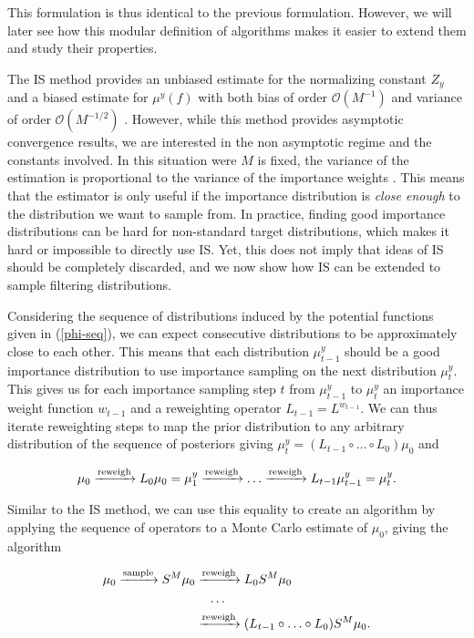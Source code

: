 This formulation is thus identical to the previous formulation. However, we will later see how this modular definition of algorithms makes it easier to extend them and study their properties.

The IS method provides an unbiased estimate for the normalizing constant $Z_y$ and a biased estimate for $\mu^y(f)$ with both bias of order $\mathcal{O}(M^{-1})$ and variance of order $\mathcal{O}(M^{-1/2})$ \cite{agapiou2017importance}. However, while this method provides asymptotic convergence results, we are interested in the non asymptotic regime and the constants involved. In this situation were $M$ is fixed, the variance of the estimation is proportional to the variance of the importance weights \cite{agapiou2017importance}. This means that the estimator is only useful if the importance distribution is \textit{close enough} to the distribution we want to sample from. In practice, finding good importance distributions can be hard for non-standard target distributions, which makes it hard or impossible to directly use IS. Yet, this does not imply that ideas of IS should be completely discarded, and we now show how IS can be extended to sample filtering distributions.

Considering the sequence of distributions induced by the potential functions given in (\ref{phi-seq}), we can expect consecutive distributions to be approximately close to each other. This means that each distribution $\mu^y_{t-1}$ should be a good importance distribution to use importance sampling on the next distribution $\mu^y_t$. This gives us for each importance sampling step $t$ from $\mu^y_{t-1}$ to $\mu^y_t$ an importance weight function $w_{t-1}$ and a reweighting operator $L_{t-1} = L^{w_{t-1}}$. We can thus iterate reweighting steps to map the prior distribution to any arbitrary distribution of the sequence of posteriors giving $\mu^y_t = (L_{t-1} \circ \ldots \circ L_0) \mu_0$ and

\begin{equation*}
  \mu_0 \xrightarrow{\text{reweigh}} L_0\mu_0 = \mu^y_1 \xrightarrow{\text{reweigh}} \ldots\xrightarrow{\text{reweigh}} L_{t-1}\mu^y_{t-1} = \mu^y_t.
\end{equation*}

Similar to the IS method, we can use this equality to create an algorithm by applying the sequence of operators to a Monte Carlo estimate of $\mu_0$, giving the algorithm

\begin{align*}
  \mu_0 \xrightarrow{\text{sample}} S^M\mu_0
  &\xrightarrow{\text{reweigh}} L_0S^M\mu_0\\
  &\ \ \ \ldots\\
  &\xrightarrow{\text{reweigh}} (L_{t-1} \circ \ldots \circ L_0)S^M\mu_0.
\end{align*}

